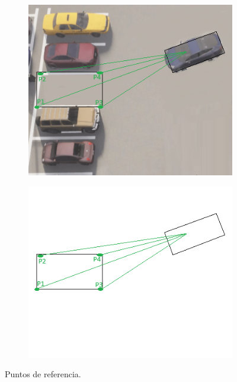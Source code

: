 \begin{figure}[!ht]
    \centering
    \begin{subfigure}{0.4\textwidth}
        \includegraphics[width=\textwidth]{img/distances_ubi_21}\label {fig:distances21}
    \end{subfigure}
    \begin{subfigure}{0.4\textwidth}
        \includegraphics[width=\textwidth]{img/distances_ubi_22}\label {fig:distances22}
    \end{subfigure}
    \caption{Puntos de referencia.}
    \label{fig:coord2}
\end{figure}
\clearpage

